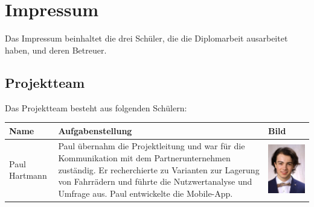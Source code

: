 \section{Impressum}
Das Impressum beinhaltet die drei Schüler, die die Diplomarbeit ausarbeitet haben, und deren Betreuer.
\subsection{Projektteam}
Das Projektteam besteht aus folgenden Schülern:\\

\begin{table}[H]
  \begin{center}
    \begin{tabular}{|p{}|p{}|p{}|}
      \hline
      \textbf{Name}  & \textbf{Aufgabenstellung}                                                                                                                                                                                                                                & \textbf{Bild}                                                                           \\
      \hline
      Paul Hartmann  & Paul übernahm die Projektleitung und war für die Kommunikation mit dem Partnerunternehmen zuständig. Er recherchierte zu Varianten zur Lagerung von Fahrrädern und führte die Nutzwertanalyse und Umfrage aus. Paul entwickelte die Mobile-App.          & \begin{minipage}{.3\textwidth} \includegraphics{images/paulhartmann.jpg} \end{minipage} \\
      \hline

\end{tabular}
\end{center}
\end{table}
